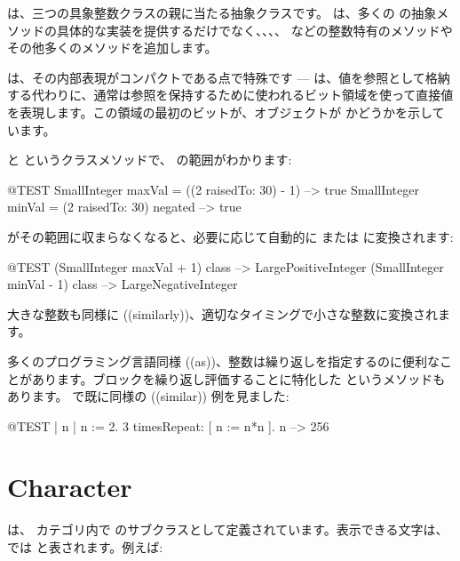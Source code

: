 \documentclass[a4paper,10pt,twoside]{book}
\begin{document}
 は、三つの具象整数クラスの親に当たる抽象クラスです。 は、多くの  の抽象メソッドの具体的な実装を提供するだけでなく、、、、 などの整数特有のメソッドやその他多くのメソッドを追加します。

 は、その内部表現がコンパクトである点で特殊です ---  は、値を参照として格納する代わりに、通常は参照を保持するために使われるビット領域を使って直接値を表現します。この領域の最初のビットが、オブジェクトが  かどうかを示しています。

 と  というクラスメソッドで、 の範囲がわかります:

\begin{code}{@TEST}
SmallInteger maxVal = ((2 raisedTo: 30) - 1)      --> true
SmallInteger minVal = (2 raisedTo: 30) negated --> true
\end{code}

 がその範囲に収まらなくなると、必要に応じて自動的に  または  に変換されます:

\begin{code}{@TEST}
(SmallInteger maxVal + 1) class --> LargePositiveInteger
(SmallInteger minVal - 1) class  --> LargeNegativeInteger
\end{code}

大きな整数も同様に ((similarly))、適切なタイミングで小さな整数に変換されます。

多くのプログラミング言語同様 ((as))、整数は繰り返しを指定するのに便利なことがあります。ブロックを繰り返し評価することに特化した  というメソッドもあります。
で既に同様の ((similar)) 例を見ました:
\begin{code}{@TEST | n |}
n := 2.
3 timesRepeat: [ n := n*n ].
n --> 256
\end{code}

\section{Character}

 は、 カテゴリ内で  のサブクラスとして定義されています。表示できる文字は、\pharo では  と表されます。例えば:
\end{document}
